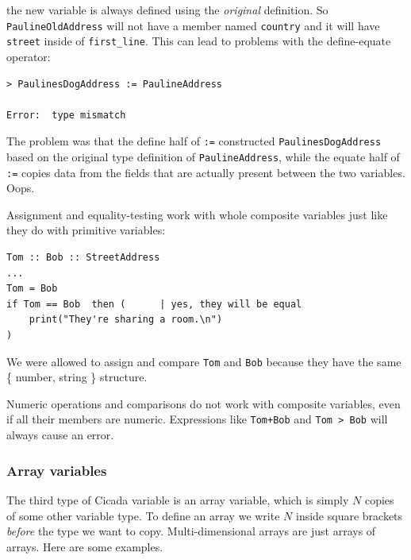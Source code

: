 \documentclass{article}
\newenvironment{code}{
       \begin{list}{}{
               \setlength{\leftmargin}{.4in}
               \setlength{\rightmargin}{0in}
               \setlength{\topsep}{.2in}
       }
       \small
       \item[] }
       { \end{list}   }
\begin{document}
\noindent the new variable is always defined using the \emph{original} definition.  So \verb#PaulineOldAddress# will not have a member named \verb#country# and it will have \verb#street# inside of \verb#first_line#.  This can lead to problems with the define-equate operator:

\begin{code} \begin{verbatim}
> PaulinesDogAddress := PaulineAddress

Error:  type mismatch
\end{verbatim} \end{code}

\noindent The problem was that the define half of \verb#:=# constructed \verb#PaulinesDogAddress# based on the original type definition of \verb#PaulineAddress#, while the equate half of \verb#:=# copies data from the fields that are actually present between the two variables.  Oops.

Assignment and equality-testing work with whole composite variables just like they do with primitive variables:

\begin{code} \begin{verbatim}
Tom :: Bob :: StreetAddress
...
Tom = Bob
if Tom == Bob  then (      | yes, they will be equal
    print("They're sharing a room.\n")
)
\end{verbatim} \end{code}

\noindent We were allowed to assign and compare \verb#Tom# and \verb#Bob# because they have the same \{ number, string \} structure.

Numeric operations and comparisons do not work with composite variables, even if all their members are numeric.  Expressions like \verb#Tom+Bob# and \verb#Tom > Bob# will always cause an error. 



\subsubsection{Array variables}

The third type of Cicada variable is an array variable, which is simply $N$ copies of some other variable type.  To define an array we write $N$ inside square brackets \emph{before} the type we want to copy.  Multi-dimensional arrays are just arrays of arrays.  Here are some examples.
\end{document}
